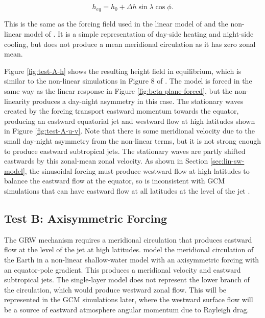 \begin{equation}
  h_{eq} = h_{0} + \Delta h \sin \lambda \cos\phi.
\end{equation}

This is the same as the forcing field used in the linear model of \citet{matsuno1966quasi} and the non-linear model of \citet{showman2011superrotation}. It is a simple representation of day-side heating and night-side cooling, but does not produce a mean meridional circulation as it has zero zonal mean.

Figure \ref{fig:test-A-h} shows the resulting height field in equilibrium, which is similar to the non-linear simulations in Figure 8 of \citet{showman2011superrotation}. The model is forced in the same way as the linear response in Figure \ref{fig:beta-plane-forced}, but the non-linearity produces a day-night asymmetry in this case. The stationary waves created by the forcing transport eastward momentum towards the equator, producing an eastward equatorial jet and westward flow at high latitudes shown in Figure \ref{fig:test-A-u-v}. Note that there is some meridional velocity due to the small day-night asymmetry from the non-linear terms, but it is not strong enough to produce eastward subtropical jets. The stationary waves are partly shifted eastwards by this zonal-mean zonal velocity. As shown in Section \ref{sec:lin-sw-model}, the sinusoidal forcing must produce westward flow at high latitudes to balance the eastward flow at the equator, so is inconsistent with GCM simulations that can have eastward flow at all latitudes at the level of the jet \citep{showman2015circulation,kataria2015atmospheric,pierrehumbert2018review}.


\subsection{Test B: Axisymmetric Forcing}

The GRW mechanism requires a meridional circulation that produces eastward flow at the level of the jet at high latitudes. \citet{shell2004superrotation} model the meridional circulation of the Earth in a non-linear shallow-water model with an axisymmetric forcing with an equator-pole gradient. This produces a meridional velocity and eastward subtropical jets. The single-layer model does not represent the lower branch of the circulation, which would produce westward zonal flow. This will be represented in the GCM simulations later, where the westward surface flow will be a source of eastward atmosphere angular momentum due to Rayleigh drag.

